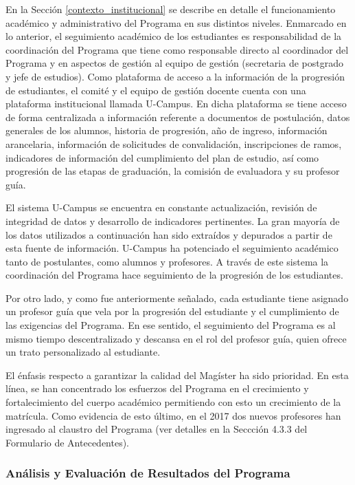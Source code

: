 En la Sección \ref{contexto_institucional} se describe en detalle el funcionamiento académico y administrativo del Programa
en sus distintos niveles. Enmarcado en lo anterior, el seguimiento académico de los estudiantes es
responsabilidad de la coordinación del Programa que tiene como responsable directo al coordinador
del Programa y en aspectos de gestión al equipo de gestión (secretaria de postgrado y jefe de
estudios). Como plataforma de acceso a la información de la progresión de estudiantes, el comité
y el equipo de gestión docente cuenta con una plataforma institucional llamada U-Campus. En
dicha plataforma se tiene acceso de forma centralizada a información referente a documentos de
postulación, datos generales de los alumnos, historia de progresión, año de ingreso, información
arancelaria, información de solicitudes de convalidación, inscripciones de ramos, indicadores de
información del cumplimiento del plan de estudio, así como progresión de las etapas de graduación,
la comisión de evaluadora y su profesor guía.

El sistema U-Campus se encuentra en constante actualización, revisión de integridad de datos
y desarrollo de indicadores pertinentes. La gran mayoría de los datos utilizados a continuación han
sido extraídos y depurados a partir de esta fuente de información. U-Campus ha
potenciado el seguimiento académico tanto de postulantes, como alumnos y profesores. A través de
este sistema la coordinación del Programa hace seguimiento de la progresión de los estudiantes.

Por otro lado, y como fue anteriormente señalado, cada estudiante tiene asignado un profesor
guía que vela por la progresión del estudiante
y el cumplimiento de las exigencias del Programa. En ese sentido, el seguimiento del Programa es
al mismo tiempo descentralizado y descansa en el rol del profesor guía, quien ofrece un trato
personalizado al estudiante.

El énfasis respecto a garantizar la calidad del Magíster ha sido prioridad. En esta línea, se han
concentrado los esfuerzos del Programa en el crecimiento y fortalecimiento del cuerpo académico
permitiendo con esto un crecimiento de la matrícula. Como evidencia de esto último, en el 2017 
dos nuevos profesores han ingresado al claustro del Programa (ver
detalles en la Seccción 4.3.3 del Formulario de Antecedentes).

\subsubsection{Análisis y Evaluación de Resultados del Programa}

